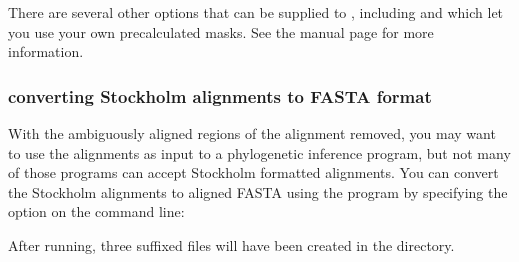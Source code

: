 There are several other options that can be supplied to
, including  and  which let you 
use your own precalculated masks. See the 
manual page for more information. 

\subsubsection{converting Stockholm alignments to FASTA format}
With the ambiguously aligned regions of the alignment removed, you may
want to use the alignments as input to a phylogenetic inference
program, but not many of those programs can accept Stockholm formatted
alignments. You can convert the Stockholm alignments to aligned FASTA
using the  program by specifying the 
option on the command line:


After running, three  suffixed files will have been created
in the  directory.




